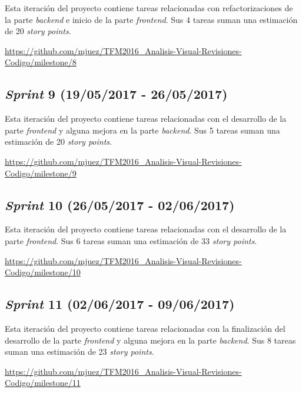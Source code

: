 Esta iteración del proyecto contiene tareas relacionadas con refactorizaciones de la parte \emph{backend} e inicio de la parte \emph{frontend}. Sus 4 tareas suman una estimación de 20 \emph{story points}.

\url{https://github.com/mjuez/TFM2016_Analisis-Visual-Revisiones-Codigo/milestone/8}


\subsection{\emph{Sprint} 9 (19/05/2017 - 26/05/2017)}

Esta iteración del proyecto contiene tareas relacionadas con el desarrollo de la parte \emph{frontend} y alguna mejora en la parte \emph{backend}. Sus 5 tareas suman una estimación de 20 \emph{story points}.

\url{https://github.com/mjuez/TFM2016_Analisis-Visual-Revisiones-Codigo/milestone/9}


\subsection{\emph{Sprint} 10 (26/05/2017 - 02/06/2017)}

Esta iteración del proyecto contiene tareas relacionadas con el desarrollo de la parte \emph{frontend}. Sus 6 tareas suman una estimación de 33 \emph{story points}.

\url{https://github.com/mjuez/TFM2016_Analisis-Visual-Revisiones-Codigo/milestone/10}


\subsection{\emph{Sprint} 11 (02/06/2017 - 09/06/2017)}

Esta iteración del proyecto contiene tareas relacionadas con la finalización del desarrollo de la parte \emph{frontend} y alguna mejora en la parte \emph{backend}. Sus 8 tareas suman una estimación de 23 \emph{story points}.

\url{https://github.com/mjuez/TFM2016_Analisis-Visual-Revisiones-Codigo/milestone/11}


